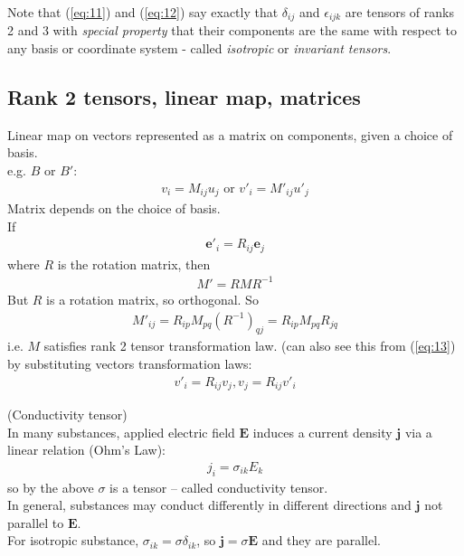 \documentclass[a4paper]{article}
\begin{document}
Note that (\ref{eq:11}) and (\ref{eq:12}) say exactly that $\delta_{ij}$ and $\epsilon_{ijk}$ are tensors of ranks 2 and 3 with \emph{special property} that their components are the same with respect to any basis or coordinate system - called \emph{isotropic} or \emph{invariant tensors}.

\subsection{Rank 2 tensors, linear map, matrices}
Linear map on vectors represented as a matrix on components, given a choice of basis.\\
e.g. $B$ or $B'$:\\
\begin{equation}\label{eq:13}
\begin{aligned}
v_i = M_{ij} u_j \text{  or  } v'_i = M'_{ij} u'_j
\end{aligned}
\end{equation}
Matrix depends on the choice of basis.\\
If 
\begin{equation*}
\begin{aligned}
\mathbf{e}'_i = R_{ij} \mathbf{e}_j
\end{aligned}
\end{equation*}
where $R$ is the rotation matrix, then
\begin{equation*}
\begin{aligned}
M' = RMR^{-1}
\end{aligned}
\end{equation*}
But $R$ is a rotation matrix, so orthogonal. So
\begin{equation*}
\begin{aligned}
M'_{ij} = R_{ip} M _{pq} \left(R^{-1}\right)_{qj} = R_{ip} M_{pq} R_{jq}
\end{aligned}
\end{equation*}
i.e. $M$ satisfies rank 2 tensor transformation law.
(can also see this from (\ref{eq:13}) by substituting vectors transformation laws:
\begin{equation*}
\begin{aligned}
v'_i = R_{ij}v_j, v_j = R_{ij} v'_i
\end{aligned}
\end{equation*}

\begin{eg} (Conductivity tensor)\\
In many substances, applied electric field $\mathbf{E}$ induces a current density $\mathbf{j}$ via a linear relation (Ohm's Law):
\begin{equation*}
\begin{aligned}
j_i = \sigma_{ik} E_k
\end{aligned}
\end{equation*}
so by the above $\sigma$ is a tensor -- called conductivity tensor.\\
In general, substances may conduct differently in different directions and $\mathbf{j}$ not parallel to $\mathbf{E}$.\\
For isotropic substance, $\sigma_{ik} = \sigma \delta_{ik}$, so $\mathbf{j} = \sigma \mathbf{E}$ and they are parallel.
\end{eg}
\end{document}
